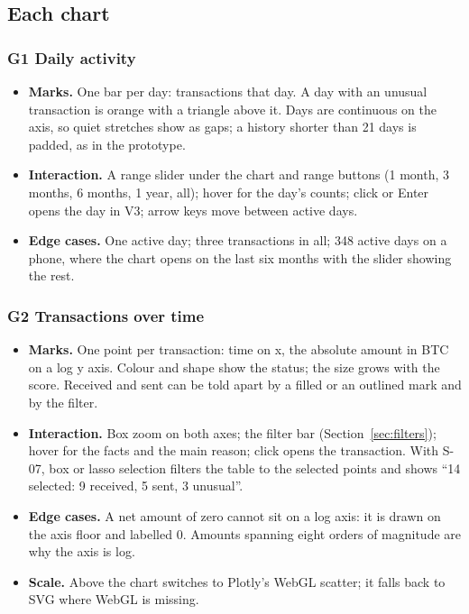 \subsection{Each chart}

\subsubsection*{G1 \quad Daily activity}
\begin{itemize}
  \item \textbf{Marks.} One bar per day: transactions that day. A day with an unusual transaction
    is orange with a triangle above it. Days are continuous on the axis, so quiet stretches show as
    gaps; a history shorter than 21 days is padded, as in the prototype.
  \item \textbf{Interaction.} A range slider under the chart and range buttons (1 month, 3 months,
    6 months, 1 year, all); hover for the day's counts; click or Enter opens the day in V3; arrow
    keys move between active days.
  \item \textbf{Edge cases.} One active day; three transactions in all; 348 active days on a phone,
    where the chart opens on the last six months with the slider showing the rest.
\end{itemize}

\subsubsection*{G2 \quad Transactions over time}
\begin{itemize}
  \item \textbf{Marks.} One point per transaction: time on x, the absolute amount in BTC on a log
    y axis. Colour and shape show the status; the size grows with the score. Received and sent can
    be told apart by a filled or an outlined mark and by the filter.
  \item \textbf{Interaction.} Box zoom on both axes; the filter bar (Section~\ref{sec:filters});
    hover for the facts and the main reason; click opens the transaction. With S-07, box or lasso
    selection filters the table to the selected points and shows ``14 selected: 9 received, 5 sent,
    3 unusual''.
  \item \textbf{Edge cases.} A net amount of zero cannot sit on a log axis: it is drawn on the
    axis floor and labelled 0. Amounts spanning eight orders of magnitude are why the axis is log.
  \item \textbf{Scale.} Above  the chart switches to Plotly's WebGL scatter;
    it falls back to SVG where WebGL is missing.
\end{itemize}


